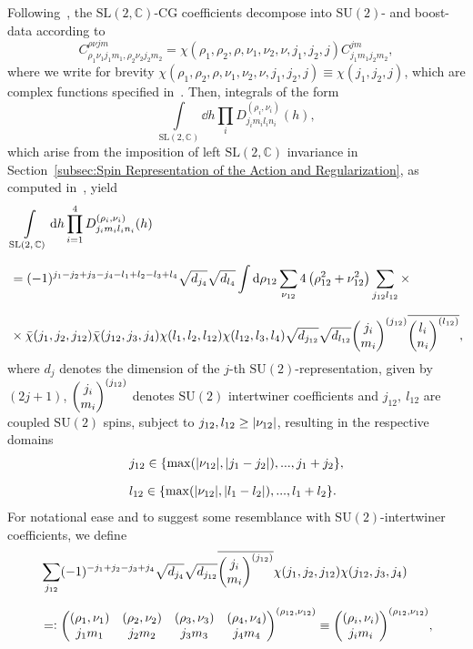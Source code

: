 \documentclass[11pt,a4paper]{article}
\newcommand{\C}{\mathbb C}
\newcommand{\SU}{\text{SU$(2)$}}
\newcommand{\SL}{\text{SL$(2,\C)$}}
\newcommand{\eqdef}{=\vcentcolon}
\begin{document}
Following~\cite{Speziale:2016axj}, the $\SL$-CG coefficients decompose into $\SU$- and boost-data according to
%
\begin{equation}
C^{\rho\nu jm}_{\rho_1\nu_1 j_1 m_1, \rho_2\nu_2 j_2 m_2}
=
\chi(\rho_1,\rho_2,\rho, \nu_1,\nu_2,\nu, j_1, j_2,j)C^{jm}_{j_1 m_1 j_2 m_2},
\end{equation}
%
where we write for brevity $\chi(\rho_1,\rho_2,\rho, \nu_1,\nu_2,\nu, j_1, j_2,j) \equiv \chi(j_1,j_2,j)$, which are complex functions specified in~\cite{Speziale:2016axj}. Then, integrals of the form
%
\begin{equation}
\int\limits_{\SL}\dd{h}\prod_i D^{(\rho_i,\nu_i)}_{j_i m_i l_i n_i}(h),
\end{equation}
%
which arise from the imposition of left $\SL$ invariance in Section~\ref{subsec:Spin Representation of the Action and Regularization}, as computed in~\cite{Speziale:2016axj}, yield
%
\begin{equation}\label{eq:Integral over four SL2C matrices}
\begin{aligned}
& \int\limits_{\SL}\dd{h}\prod_{i=1}^4 D^{(\rho_i,\nu_i)}_{j_i m_i l_i n_i}(h)\\[7pt]
& =
(-1)^{j_1-j_2+j_3-j_4-l_1+l_2-l_3+l_4}\sqrt{d_{j_4}}\sqrt{d_{l_4}}\int\dd{\rho_{12}}\sum_{\nu_{12}}4\left(\rho_{12}^2+\nu_{12}^2\right)\sum_{j_{12}l_{12}}\times\\[7pt]
& \times
\bar{\chi}(j_1, j_2, j_{12})\bar{\chi}(j_{12},j_3,j_4)\chi(l_1,l_2,l_{12})\chi(l_{12},l_3,l_4)\sqrt{d_{j_{12}}}\sqrt{d_{l_{12}}}\mqty(j_i \\ m_i)^{(j_{12})}\overline{\mqty(l_i \\ n_i)^{(l_{12})}},
\end{aligned}
\end{equation}
%
where $d_j$ denotes the dimension of the $j$-th $\SU$-representation, given by $(2j+1)$, $\mqty(j_i \\ m_i)^{(j_{12})}$ denotes $\SU$ intertwiner coefficients and $j_{12},~l_{12}$ are coupled $\SU$ spins, subject to $j_{12},l_{12}\geq\abs{\nu_{12}}$, resulting in the respective domains
%
\begin{align}
& j_{12} \in \{\max(\abs{\nu_{12}},\abs{j_1-j_2}),...,j_1+j_2\},\\[7pt]
& l_{12} \in \{\max(\abs{\nu_{12}},\abs{l_1-l_2}),...,l_1+l_2\}.
\end{align}
%
For notational ease and to suggest some resemblance with $\SU$-intertwiner coefficients, we define
%
\begin{equation}\label{eq:definition of SL2C intertwiner coefficients}
\begin{aligned}
& \sum_{j_{12}}(-1)^{-j_1 +j_2-j_3+j_4}\sqrt{d_{j_4}}\sqrt{d_{j_{12}}}\overline{\mqty(j_i \\ m_i)^{(j_{12})}}\chi(j_1,j_2,j_{12})\chi(j_{12},j_3,j_4)\\[7pt]
& \eqdef
\mqty((\rho_1,\nu_1) & (\rho_2,\nu_2) & (\rho_3,\nu_3) & (\rho_4,\nu_4) \\ j_1 m_1 & j_2 m_2 & j_3 m_3 & j_4 m_4)^{(\rho_{12},\nu_{12})}
\equiv
\mqty((\rho_i,\nu_i) \\ j_i m_i)^{(\rho_{12},\nu_{12})},
\end{aligned}
\end{equation}
\end{document}
